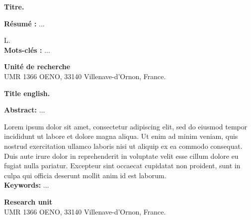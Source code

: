 \thispagestyle{empty}
\begin{small}
\linespread{1.05}\selectfont
\begin{center}
\textbf{Titre.}
\end{center}

\textbf{Résumé :} %
...

L.\newline
\\
\textbf{Mots-clés :} ... \\

\vspace{0.4cm}
\noindent\makebox[\linewidth]{\rule{\textwidth}{0.4pt}}

\vfill
\begin{center}
\textbf{Unité de recherche} \\
UMR 1366 OENO, 33140 Villenave-d'Ornon, France.
\end{center}
\end{small}

\cleardoublepage                     %

\thispagestyle{empty}
\begin{small}
\linespread{1.05}\selectfont
\begin{center}
\textbf{Title english.}
\end{center}

\textbf{Abstract:} 
...

Lorem ipsum dolor sit amet, consectetur adipiscing elit, sed do eiusmod tempor incididunt ut labore et dolore magna aliqua. Ut enim ad minim veniam, quis nostrud exercitation ullamco laboris nisi ut aliquip ex ea commodo consequat. Duis aute irure dolor in reprehenderit in voluptate velit esse cillum dolore eu fugiat nulla pariatur. Excepteur sint occaecat cupidatat non proident, sunt in culpa qui officia deserunt mollit anim id est laborum.\newline
\\
\textbf{Keywords:} ... \\

\vspace{0.4cm}
\noindent\makebox[\linewidth]{\rule{\textwidth}{0.4pt}}

\vfill
\begin{center}
\textbf{Research unit} \\
UMR 1366 OENO, 33140 Villenave-d'Ornon, France.
\end{center}
\end{small}

\cleardoublepage                     %